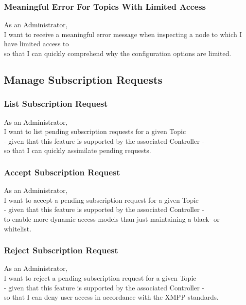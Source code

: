 \subsubsection{Meaningful Error For Topics With Limited Access}

As an Administrator,\\
I want to receive a meaningful error message when inspecting a node to which I have limited access to \\
so that I can quickly comprehend why the configuration options are limited.

\subsection{Manage Subscription Requests}

\subsubsection{List Subscription Request}
As an Administrator,\\
I want to list pending subscription requests for a given Topic\\
- given that this feature is supported by the associated Controller -\\
so that I can quickly assimilate pending requests.

\subsubsection{Accept Subscription Request}

As an Administrator,\\
I want to accept a pending subscription request for a given Topic\\
- given that this feature is supported by the associated Controller -\\
to enable more dynamic access models than just maintaining a black- or whitelist.

\subsubsection{Reject Subscription Request}

As an Administrator,\\
I want to reject a pending subscription request for a given Topic\\
- given that this feature is supported by the associated Controller -\\
so that I can deny user access in accordance with the XMPP standards.

